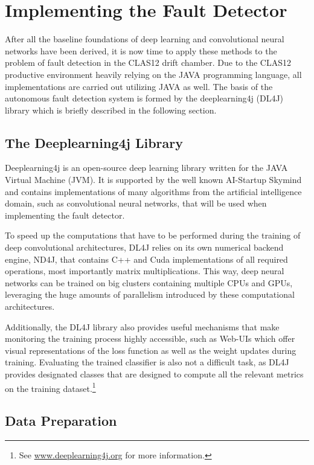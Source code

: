 \chapter{Implementing the Fault Detector}

After all the baseline foundations of deep learning and convolutional
neural networks have been derived, it is now time to apply these
methods to the problem of fault detection in the CLAS12 drift
chamber. Due to the CLAS12 productive environment heavily relying on
the JAVA programming language, all implementations are carried out
utilizing JAVA as well. The basis of the autonomous
fault detection system is formed by the deeplearning4j (DL4J)
library which is briefly described in the following section.

\section{The Deeplearning4j Library}

Deeplearning4j is an open-source deep learning library written for the
JAVA Virtual Machine (JVM). It is supported by the well known
AI-Startup Skymind and contains implementations of many algorithms
from the artificial intelligence domain, such as convolutional neural
networks, that will be used when implementing the fault detector.

To speed up the computations that have to be performed during the
training of deep convolutional architectures, DL4J relies on its own
numerical backend engine, ND4J, that contains C++ and Cuda
implementations of all required operations, most importantly matrix
multiplications. This way, deep neural networks can be trained on
big clusters containing multiple CPUs and GPUs, leveraging the huge
amounts of parallelism introduced by these computational
architectures.

Additionally, the DL4J library also provides useful mechanisms that
make monitoring the training process highly accessible, such as
Web-UIs which offer visual representations of the loss function as
well as the weight updates during training. Evaluating the trained
classifier is also not a difficult task, as DL4J provides
designated classes that are designed to compute all the relevant
metrics on the training dataset.\footnote{See
  \url{www.deeplearning4j.org} for more information.}

\section{Data Preparation}

